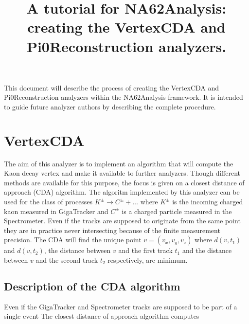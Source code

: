 \documentclass{article}
\title{A tutorial for NA62Analysis: creating the VertexCDA and
Pi0Reconstruction analyzers.}
\begin{document}
\maketitle

This document will describe the process of creating the VertexCDA and
Pi0Reconstruction analyzers within the NA62Analysis framework. It is intended to
guide future analyzer authors by describing the complete procedure.

\section{VertexCDA}
The aim of this analyzer is to implement an algorithm that will compute the Kaon
decay vertex and make it available to further analyzers. Though different
methods are available for this purpose, the focus is given on a closest distance
of approach (CDA) algorithm. The algoritm implemented by this analyzer can be
used for the class of processes $K^\pm\to C^\pm+\ldots$ where $K^\pm$ is the
incoming charged kaon measured in GigaTracker and $C^\pm$ is a charged particle
measured in the Spectrometer. Even if the tracks are supposed to originate from
the same point they are in practice never intersecting because of the
finite measurement precision. The CDA will find the unique point
$v=(v_x,v_y,v_z)$ where $d(v,t_1)$ and $d(v,t_2)$, the distance between $v$ and
the first track $t_1$ and the distance between $v$ and the second track $t_2$
respectively, are minimum.

\subsection{Description of the CDA algorithm}
 Even if the GigaTracker and Spectrometer
tracks are supposed to be part of a single event The closest distance of approach algorithm computes
\end{document}
